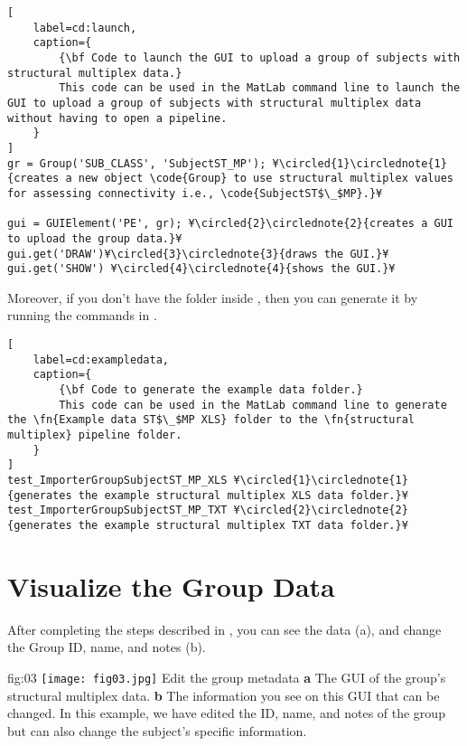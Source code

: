 \documentclass[justified]{tufte-handout}
\begin{document}
%
\begin{lstlisting}[
	label=cd:launch,
	caption={
		{\bf Code to launch the GUI to upload a group of subjects with structural multiplex data.}
		This code can be used in the MatLab command line to launch the GUI to upload a group of subjects with structural multiplex data without having to open a pipeline.
	}
]
gr = Group('SUB_CLASS', 'SubjectST_MP'); ¥\circled{1}\circlednote{1}{creates a new object \code{Group} to use structural multiplex values for assessing connectivity i.e., \code{SubjectST$\_$MP}.}¥

gui = GUIElement('PE', gr); ¥\circled{2}\circlednote{2}{creates a GUI to upload the group data.}¥
gui.get('DRAW')¥\circled{3}\circlednote{3}{draws the GUI.}¥
gui.get('SHOW') ¥\circled{4}\circlednote{4}{shows the GUI.}¥
\end{lstlisting}

Moreover, if you don't have the  folder inside , then you can generate it by running the commands in .

\begin{lstlisting}[
	label=cd:exampledata,
	caption={
		{\bf Code to generate the example data folder.}
		This code can be used in the MatLab command line to generate the \fn{Example data ST$\_$MP XLS} folder to the \fn{structural multiplex} pipeline folder.
	}
]
test_ImporterGroupSubjectST_MP_XLS ¥\circled{1}\circlednote{1}{generates the example structural multiplex XLS data folder.}¥
test_ImporterGroupSubjectST_MP_TXT ¥\circled{2}\circlednote{2}{generates the example structural multiplex TXT data folder.}¥
\end{lstlisting}


\section{Visualize the Group Data}

After completing the steps described in , you can see the data (a), and change the Group ID, name, and notes (b). 

	{fig:03}
	{
	\texttt{[image: fig03.jpg]}
	}
	{Edit the group metadata}
	{ 
	{\bf a} The GUI of the group's structural multiplex data. 
	{\bf b} The information you see on this GUI that can be changed. In this example, we have edited the ID, name, and notes of the group but can also change the subject's specific information.
	}
\end{document}
